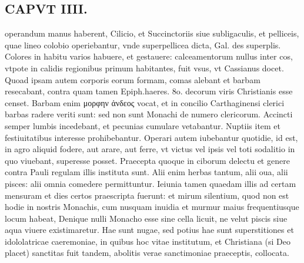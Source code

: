 \documentclass{article}
\begin{document}
\begin{pages}
\section*{CAPVT  IIII. }
\marginpar{[ p.221 ]}\pstart operandum manus haberent, Cilicio, et Succinctoriis siue subligaculis, et pelliceis, quae lineo colobio operiebantur, vnde superpellicea dicta, Gal. des superplis. Colores in habitu varios habuere, et gestauere: calceamentorum nullus inter cos, vtpote in calidis regionibus primum habitantes, fuit vsus, vt Cassianus docet. Quoad ipsam autem corporis eorum formam, comas alebant et barbam resecabant, contra quam tamen Epiph.haeres. 8o. decorum viris Christianis esse censet. Barbam enim μορφην ἀνδεος vocat, et in concilio Carthaginensi clerici barbas radere veriti sunt: sed non sunt Monachi de numero clericorum. Accincti semper lumbis incedebant, et pecunias cumulare vetabantur. Nuptiis item et festiuitatibus interesse prohibebantur. Operari autem iubebantur quotidie, id est, in agro aliquid fodere, aut arare, aut ferre, vt victus vel ipsis vel toti sodalitio in quo viuebant, superesse posset. Praecepta quoque in ciborum delectu et genere contra Pauli regulam illis instituta sunt. Alii enim herbas tantum, alii oua, alii pisces: alii omnia comedere permittuntur. Ieiunia tamen quaedam illis ad certam mensuram et dies certos praescripta fuerunt: et mirum silentium, quod non est hodie in nostris Monachis, cum nusquam inuidia et murmur maius frequentiusque locum habeat, Denique nulli Monacho esse sine cella licuit, ne velut piscis siue aqua viuere existimaretur. Hae sunt nugae, sed potius hae sunt superstitiones et idololatricae caeremoniae, in quibus hoc vitae institutum, et Christiana (si Deo placet) sanctitas fuit tandem, abolitis verae sanctimoniae praeceptis, collocata.  \pend

\end{pages}
\end{document}
